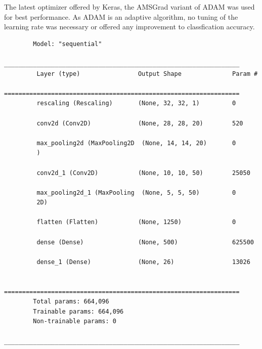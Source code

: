 \documentclass[a4paper]{exam}
\begin{document}
\begin{questions}
    The latest optimizer offered by Keras, the AMSGrad variant of ADAM was used for best performance.
    As ADAM is an adaptive algorithm, no tuning of the learning rate was necessary or offered any improvement to classfication accuracy.

    \begin{footnotesize}
        \begin{verbatim}
        Model: "sequential"
        _________________________________________________________________
         Layer (type)                Output Shape              Param #   
        =================================================================
         rescaling (Rescaling)       (None, 32, 32, 1)         0         
                                                                         
         conv2d (Conv2D)             (None, 28, 28, 20)        520       
                                                                         
         max_pooling2d (MaxPooling2D  (None, 14, 14, 20)       0         
         )                                                               
                                                                         
         conv2d_1 (Conv2D)           (None, 10, 10, 50)        25050     
                                                                         
         max_pooling2d_1 (MaxPooling  (None, 5, 5, 50)         0         
         2D)                                                             
                                                                         
         flatten (Flatten)           (None, 1250)              0         
                                                                         
         dense (Dense)               (None, 500)               625500    
                                                                         
         dense_1 (Dense)             (None, 26)                13026     
                                                                         
        =================================================================
        Total params: 664,096
        Trainable params: 664,096
        Non-trainable params: 0
        _________________________________________________________________
    \end{verbatim}
    \end{footnotesize}



\end{questions}
\end{document}
